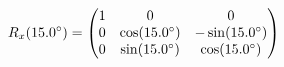 \documentclass[preview]{standalone}
\begin{document}
\begin{align*}
\special{dvisvgm:raw <g id='unique000'>}R_x(15.0^\circ) = \begin{pmatrix} 1 & 0 & 0 \\ 0 & \cos(15.0^\circ) & -\sin(15.0^\circ) \\ 0 & \sin(15.0^\circ) & \cos(15.0^\circ) \end{pmatrix}\special{dvisvgm:raw </g>}
\end{align*}
\end{document}
